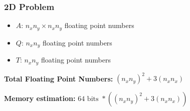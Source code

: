 \documentclass[letterpaper,12pt]{article}
\begin{document}
\subsubsection{2D Problem}
\begin{itemize}
\item $A$: $n_x n_y \times n_x n_y$ floating point numbers
\item $Q$: $n_x n_y$ floating point numbers
\item $T$: $n_x n_y$ floating point numbers
\end{itemize}
\textbf{Total Floating Point Numbers:} $(n_x n_y)^2 + 3 (n_x n_x)$

\textbf{Memory estimation:} $64 \text{ bits } * ((n_x n_y)^2 + 3 (n_x n_x))$  
\end{document}
